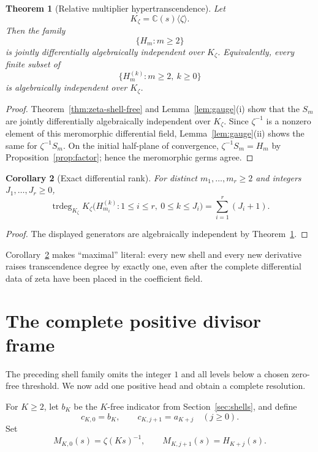\documentclass[11pt]{article}
\newtheorem{theorem}{Theorem}[section]
\newtheorem{corollary}[theorem]{Corollary}
\theoremstyle{definition}
\theoremstyle{remark}
\newcommand{\C}{\mathbb C}
\newcommand{\trdeg}{\operatorname{trdeg}}
\begin{document}
\begin{theorem}[Relative multiplier hypertranscendence]\label{thm:relative}
Let
\[
 K_\zeta=\C(s)\langle\zeta\rangle.
\]
Then the family
\[
 \{H_m:m\geq2\}
\]
is jointly differentially algebraically independent over \(K_\zeta\).  Equivalently, every
finite subset of
\[
 \{H_m^{(k)}:m\geq2,\ k\geq0\}
 \tag{5.2}
\]
is algebraically independent over \(K_\zeta\).
\end{theorem}

\begin{proof}
Theorem~\ref{thm:zeta-shell-free} and Lemma~\ref{lem:gauge}(i) show that the \(S_m\) are jointly
differentially algebraically independent over \(K_\zeta\).  Since \(\zeta^{-1}\) is a nonzero
element of this meromorphic differential field, Lemma~\ref{lem:gauge}(ii) shows the same for
\(\zeta^{-1}S_m\).  On the initial half-plane of convergence,
\(\zeta^{-1}S_m=H_m\) by Proposition~\ref{prop:factor}; hence the meromorphic germs agree.
\end{proof}

\begin{corollary}[Exact differential rank]\label{cor:rank}
For distinct \(m_1,\ldots,m_r\geq2\) and integers \(J_1,\ldots,J_r\geq0\),
\[
 \trdeg_{K_\zeta}
 K_\zeta\bigl(H_{m_i}^{(k)}:
 1\leq i\leq r,\ 0\leq k\leq J_i\bigr)
 =\sum_{i=1}^r(J_i+1).
 \tag{5.3}
\]
\end{corollary}

\begin{proof}
The displayed generators are algebraically independent by Theorem~\ref{thm:relative}.
\end{proof}

Corollary~\ref{cor:rank} makes ``maximal'' literal: every new shell and every new derivative
raises transcendence degree by exactly one, even after the complete differential data of zeta
have been placed in the coefficient field.

\section{The complete positive divisor frame}\label{sec:rhframe}

The preceding shell family omits the integer \(1\) and all levels below a chosen zero-free
threshold.  We now add one positive head and obtain a complete resolution.

For \(K\geq2\), let \(b_K\) be the \(K\)-free indicator from
Section~\ref{sec:shells}, and define
\[
 c_{K,0}=b_K,\qquad c_{K,j+1}=a_{K+j}\quad(j\geq0).
 \tag{6.1}
\]
Set
\[
 M_{K,0}(s)=\zeta(Ks)^{-1},\qquad
 M_{K,j+1}(s)=H_{K+j}(s).
 \label{eq:complete-multipliers}
 \tag{6.2}
\]
\end{document}
